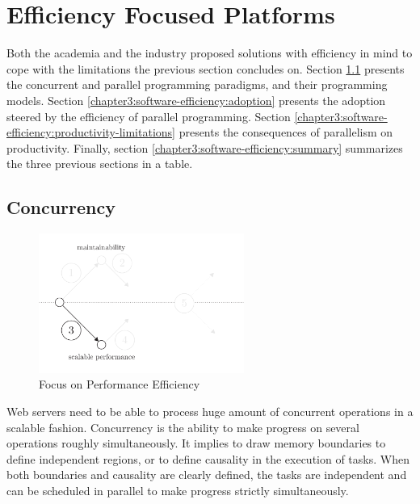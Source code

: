 \section{Efficiency Focused Platforms} \label{chapter3:software-efficiency}

Both the academia and the industry proposed solutions with efficiency in mind to cope with the limitations the previous section concludes on.
Section \ref{chapter3:software-efficiency:concurrency} presents the concurrent and parallel programming paradigms, and their programming models. %
Section \ref{chapter3:software-efficiency:adoption} presents the adoption steered by the efficiency of parallel programming.
Section \ref{chapter3:software-efficiency:productivity-limitations} presents the consequences of parallelism on productivity.
Finally, section \ref{chapter3:software-efficiency:summary} summarizes the three previous sections in a table.

\subsection{Concurrency} \label{chapter3:software-efficiency:concurrency}

\begin{figure}[!h]
\begin{center}
\includegraphics[width=0.6\textwidth]{../ressources/state-of-the-art-3.pdf}
\end{center}
\caption{Focus on Performance Efficiency}
\label{fig:state-of-the-art-3}
\end{figure}

Web servers need to be able to process huge amount of concurrent operations in a scalable fashion.
Concurrency is the ability to make progress on several operations roughly simultaneously.
It implies to draw memory boundaries to define independent regions, or to define causality in the execution of tasks.
When both boundaries and causality are clearly defined, the tasks are independent and can be scheduled in parallel to make progress strictly simultaneously.


